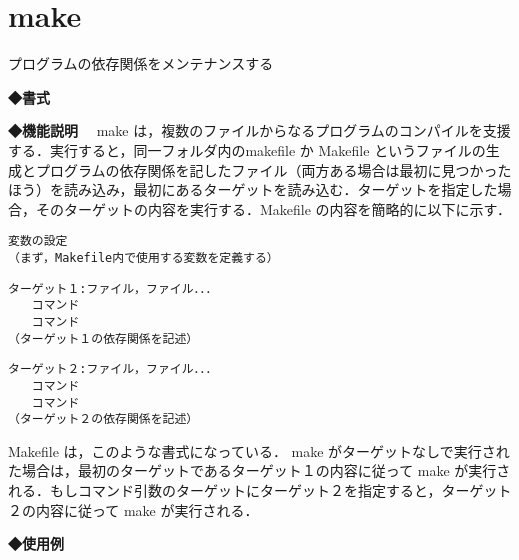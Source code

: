 \label{cmd:make}
\section{make}
プログラムの依存関係をメンテナンスする\par

{\bf ◆書式}
\begin{center}
\begin{screen}
\begin{alltt}
 %　make ターゲット
\end{alltt}
\end{screen}
\end{center}

{\bf ◆機能説明}
　make は，複数のファイルからなるプログラムのコンパイルを支援する．実行すると，同一フォルダ内のmakefile か Makefile というファイルの生成とプログラムの依存関係を記したファイル（両方ある場合は最初に見つかったほう）を読み込み，最初にあるターゲットを読み込む．ターゲットを指定した場合，そのターゲットの内容を実行する．Makefile の内容を簡略的に以下に示す．\\

\begin{center}
\begin{breakbox}
\begin{alltt}
 変数の設定
 （まず， Makefile 内で使用する変数を定義する）

 ターゲット１ : ファイル，ファイル．．．
 　　コマンド
 　　コマンド
 （ターゲット１の依存関係を記述）

 ターゲット２ : ファイル，ファイル．．．
 　　コマンド
 　　コマンド
 （ターゲット２の依存関係を記述）
\end{alltt}
\end{breakbox}
\end{center}

Makefile は，このような書式になっている． make がターゲットなしで実行された場合は，最初のターゲットであるターゲット１の内容に従って make が実行される．もしコマンド引数のターゲットにターゲット２を指定すると，ターゲット２の内容に従って make が実行される．\par

{\bf ◆使用例}

\begin{center}
\begin{breakbox}
\begin{alltt}
 % \underline{make}  \keybox{Enter}
\end{alltt}
\end{breakbox}
\end{center}
\clearpage
